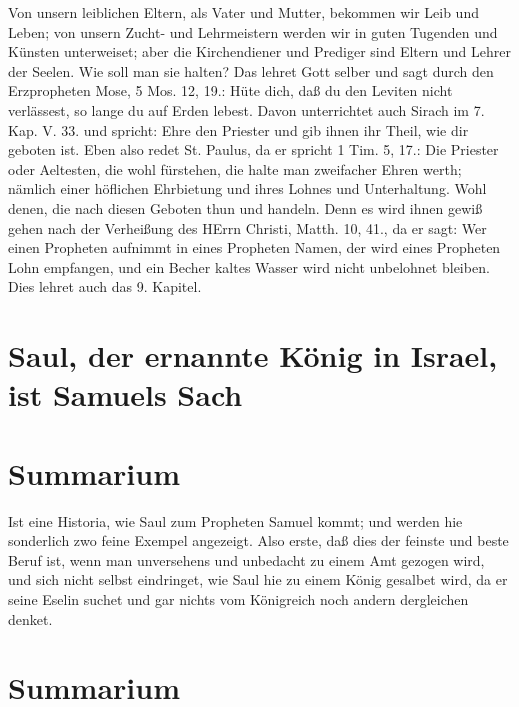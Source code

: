 Von unsern leiblichen Eltern, als Vater und Mutter, bekommen wir Leib und Leben; von unsern Zucht- und Lehrmeistern werden wir in guten Tugenden und Künsten unterweiset; aber die Kirchendiener und Prediger sind Eltern und Lehrer der Seelen. Wie soll man sie halten? Das lehret Gott selber und sagt durch den Erzpropheten Mose, 5 Mos. 12, 19.: Hüte dich, daß du den Leviten nicht verlässest, so lange du auf Erden lebest. Davon unterrichtet auch Sirach im 7. Kap. V. 33. und spricht: Ehre den Priester und gib ihnen ihr Theil, wie dir geboten ist. Eben also redet St. Paulus, da er spricht 1 Tim. 5, 17.: Die Priester oder Aeltesten, die wohl fürstehen, die halte man zweifacher Ehren werth; nämlich einer höflichen Ehrbietung und ihres Lohnes und Unterhaltung. Wohl denen, die nach diesen Geboten thun und handeln. Denn es wird ihnen gewiß gehen nach der Verheißung des HErrn Christi, Matth. 10, 41., da er sagt: Wer einen Propheten aufnimmt in eines Propheten Namen, der wird eines Propheten Lohn empfangen, und ein Becher kaltes Wasser wird nicht unbelohnet bleiben. Dies lehret auch das 9. Kapitel.

\section{Saul, der ernannte König in Israel, ist Samuels Sach}

\section{Summarium}

Ist eine Historia, wie Saul zum Propheten Samuel kommt; und werden hie sonderlich zwo feine Exempel angezeigt. Also erste, daß dies der feinste und beste Beruf ist, wenn man unversehens und unbedacht zu einem Amt gezogen wird, und sich nicht selbst eindringet, wie Saul hie zu einem König gesalbet wird, da er seine Eselin suchet und gar nichts vom Königreich noch andern dergleichen denket.

\section{Summarium}

